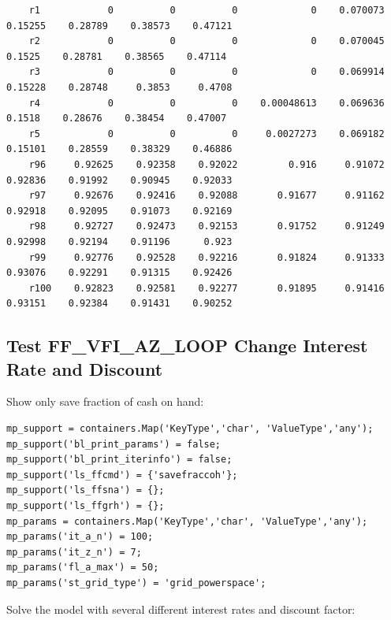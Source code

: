\documentclass[
]{book}
\begin{document}
\begin{verbatim}
    r1            0          0          0             0    0.070073    0.15255    0.28789    0.38573    0.47121
    r2            0          0          0             0    0.070045     0.1525    0.28781    0.38565    0.47114
    r3            0          0          0             0    0.069914    0.15228    0.28748     0.3853     0.4708
    r4            0          0          0    0.00048613    0.069636     0.1518    0.28676    0.38454    0.47007
    r5            0          0          0     0.0027273    0.069182    0.15101    0.28559    0.38329    0.46886
    r96     0.92625    0.92358    0.92022         0.916     0.91072    0.92836    0.91992    0.90945    0.92033
    r97     0.92676    0.92416    0.92088       0.91677     0.91162    0.92918    0.92095    0.91073    0.92169
    r98     0.92727    0.92473    0.92153       0.91752     0.91249    0.92998    0.92194    0.91196      0.923
    r99     0.92776    0.92528    0.92216       0.91824     0.91333    0.93076    0.92291    0.91315    0.92426
    r100    0.92823    0.92581    0.92277       0.91895     0.91416    0.93151    0.92384    0.91431    0.90252
\end{verbatim}

\hypertarget{test-ff_vfi_az_loop-change-interest-rate-and-discount}{%
\subsection{Test FF\_VFI\_AZ\_LOOP Change Interest Rate and Discount}\label{test-ff_vfi_az_loop-change-interest-rate-and-discount}}

Show only save fraction of cash on hand:

\begin{verbatim}
mp_support = containers.Map('KeyType','char', 'ValueType','any');
mp_support('bl_print_params') = false;
mp_support('bl_print_iterinfo') = false;
mp_support('ls_ffcmd') = {'savefraccoh'};
mp_support('ls_ffsna') = {};
mp_support('ls_ffgrh') = {};
mp_params = containers.Map('KeyType','char', 'ValueType','any');
mp_params('it_a_n') = 100;
mp_params('it_z_n') = 7;
mp_params('fl_a_max') = 50;
mp_params('st_grid_type') = 'grid_powerspace';
\end{verbatim}

Solve the model with several different interest rates and discount
factor:
\end{document}
